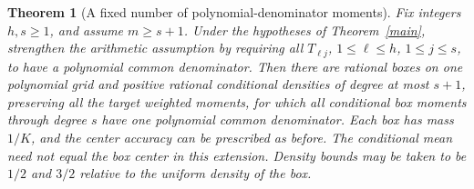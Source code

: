 \documentclass[11pt]{article}
\newtheorem{theorem}{Theorem}
\begin{document}
\begin{theorem}[A fixed number of polynomial-denominator moments]\label{fixedmoments}
Fix integers $h,s\ge1$, and assume $m\ge s+1$. Under the hypotheses
of Theorem~\ref{main}, strengthen the arithmetic assumption by requiring
all $T_{\ell j}$, $1\le\ell\le h$, $1\le j\le s$, to have a
polynomial common denominator. Then there are rational boxes on one polynomial grid and positive
rational conditional densities of degree at most $s+1$, preserving all
the target weighted moments, for which \emph{all} conditional box moments
through degree $s$ have one polynomial common denominator. Each box has
mass $1/K$, and the center accuracy can be prescribed as before. The
conditional mean need not equal the box center in this extension. Density
bounds may be taken to be $1/2$ and $3/2$ relative to the uniform density
of the box.
\end{theorem}
\end{document}
